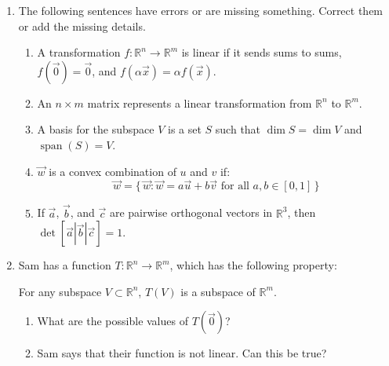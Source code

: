 \documentclass[red]{tutorial}
\newcommand{\R}{\mathbb{R}}
\DeclareMathOperator{\Span} {span}
\theoremstyle{definition}
\theoremstyle{theorem}
\begin{document}
\begin{tutorial}
  \begin{enumerate}
    \item The following sentences have errors or are missing 
      something. Correct
      them or add the missing details.
      \begin{enumerate}
        \item
          A transformation $f\colon\R^n\to \R^m$ is linear if 
          it sends sums to sums, $f(\vec0) = \vec0$, and 
          $f(\alpha \vec x) = \alpha f(\vec x)$.
        \item
          An $n\times m$ matrix represents a linear 
          transformation from $\R^n$
          to $\R^m$.
        \item %
          A basis for the subspace $V$ is a set $S$ 
          such that $\dim S = \dim V$ and $\Span(S) = V$.
        \item
          $\vec w$ is a convex combination of $u$ and $v$ if:
          \begin{equation*}
            \vec w =
            \bigl\{\,\vec w:\vec w = a\vec u %
              +b\vec v \text{ for all } a,b\in [0,1]\,
            \bigr\}
          \end{equation*}
        \item %
          If $\vec a$, $\vec b$, and $\vec c$ are pairwise orthogonal 
          vectors in $\R^3$, then 
          $\det \left[\vec a|\vec b|\vec c\right] = 1$.
      \end{enumerate}
    \item
      Sam has a function $T\colon\R^n\to \R^m$, which has the following
      property:
      \begin{center}
        For any subspace $V\subset \R^n$, $T(V)$ is a subspace of $\R^m$.
      \end{center}
      \begin{enumerate}
        \item What are the possible values of $T(\vec0)$?
        \item Sam says that their function is not linear. Can this be true?
      \end{enumerate}

\end{enumerate}
\end{tutorial}
\end{document}
